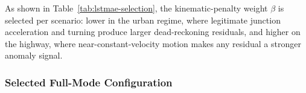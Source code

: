 \documentclass[12pt, a4paper]{report}
\begin{document}
\begin{table}[H]
\centering
\caption{Full-mode LSTM-AE model selection by validation reconstruction error
(Eq.~\ref{eq:ta_error}) under the FPR constraint, mean~$\pm$~std over $\geq 3$
seeds. Selected configuration per scenario in bold; values to be finalised on
real data.}
\label{tab:lstmae-selection}
\renewcommand{\arraystretch}{1.2}
\end{table}

As shown in Table~\ref{tab:lstmae-selection}, the kinematic-penalty weight
$\beta$ is selected per scenario: lower in the urban regime, where legitimate
junction acceleration and turning produce larger dead-reckoning residuals, and
higher on the highway, where near-constant-velocity motion makes any residual a
stronger anomaly signal.

\subsubsection{Selected Full-Mode Configuration}
\end{document}
